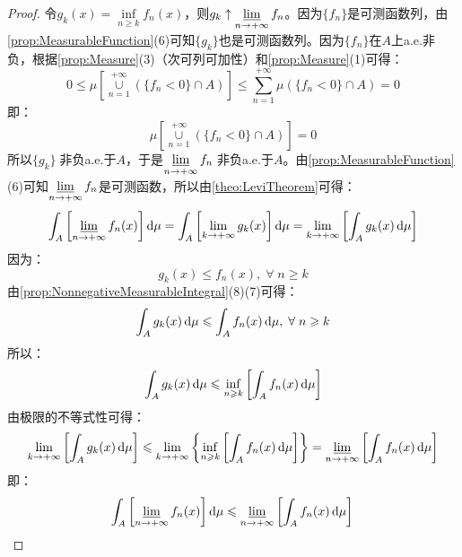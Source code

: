 \begin{proof}
	令$g_k(x)=\inf\limits_{n\geqslant k}f_n(x)$，则$g_k\uparrow\varliminf\limits_{n\to+\infty}f_n$。因为$\{f_n\}$是可测函数列，由\cref{prop:MeasurableFunction}(6)可知$\{g_k\}$也是可测函数列。因为$\{f_n\}$在$A$上a.e.非负，根据\cref{prop:Measure}(3)（次可列可加性）和\cref{prop:Measure}(1)可得：
	\begin{equation*}
		0\leqslant\mu\left[\underset{n=1}{\overset{+\infty}{\cup}}(\{f_n<0\}\cap A)\right]\leqslant\sum_{n=1}^{+\infty}\mu(\{f_n<0\}\cap A)=0
	\end{equation*}
	即：
	\begin{equation*}
		\mu\left[\underset{n=1}{\overset{+\infty}{\cup}}(\{f_n<0\}\cap A)\right]=0
	\end{equation*}
	所以$\{g_k\}\;$非负a.e.于$A$，于是$\varliminf\limits_{n\to+\infty}f_n\;$非负a.e.于$A$。由\cref{prop:MeasurableFunction}(6)可知$\varliminf\limits_{n\to+\infty}f_n$是可测函数，所以由\cref{theo:LeviTheorem}可得：
	\begin{align*}
		\int_{A}\left[\varliminf_{n\to+\infty}f_n(x)\right]\mathop{}\!\mathrm{d}\mu=\int_{A}\left[\lim_{k\to+\infty}g_k(x)\right]\mathop{}\!\mathrm{d}\mu=\lim_{k\to+\infty}\left[\int_{A}g_k(x)\mathop{}\!\mathrm{d}\mu\right]
	\end{align*}
	因为：
	\begin{equation*}
		g_k(x)\leqslant f_n(x),\;\forall\;n\geqslant k
	\end{equation*}
	由\cref{prop:NonnegativeMeasurableIntegral}(8)(7)可得：
	\begin{equation*}
		\int_{A}g_k(x)\mathop{}\!\mathrm{d}\mu\leqslant\int_{A}f_n(x)\mathop{}\!\mathrm{d}\mu,\;\forall\;n\geqslant k
	\end{equation*}
	所以：
	\begin{equation*}
		\int_{A}g_k(x)\mathop{}\!\mathrm{d}\mu\leqslant\inf_{n\geqslant k}\left[\int_{A}f_n(x)\mathop{}\!\mathrm{d}\mu\right]
	\end{equation*}
	由极限的不等式性可得：
	\begin{equation*}
		\lim_{k\to+\infty}\left[\int_{A}g_k(x)\mathop{}\!\mathrm{d}\mu\right]\leqslant\lim_{k\to+\infty}\left\{\inf_{n\geqslant k}\left[\int_{A}f_n(x)\mathop{}\!\mathrm{d}\mu\right]\right\}=\varliminf_{n\to+\infty}\left[\int_{A}f_n(x)\mathop{}\!\mathrm{d}\mu\right]
	\end{equation*}
	即：
	\begin{equation*}
		\int_{A}\left[\varliminf_{n\to+\infty}f_n(x)\right]\mathop{}\!\mathrm{d}\mu\leqslant\varliminf_{n\to+\infty}\left[\int_{A}f_n(x)\mathop{}\!\mathrm{d}\mu\right]\qedhere
	\end{equation*}
\end{proof}
